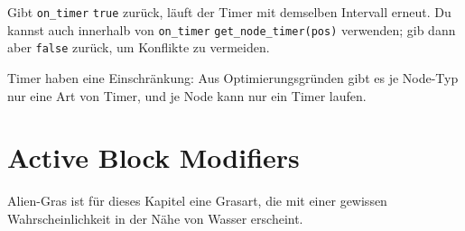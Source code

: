 Gibt \texttt{on\_\allowbreak{}timer} \texttt{true} zurück, läuft der
Timer mit demselben Intervall erneut. Du kannst auch innerhalb von
\texttt{on\_\allowbreak{}timer}
\texttt{get\_\allowbreak{}node\_\allowbreak{}timer(pos)} verwenden; gib
dann aber \texttt{false} zurück, um Konflikte zu vermeiden.

Timer haben eine Einschränkung: Aus Optimierungsgründen gibt es je
Node-Typ nur eine Art von Timer, und je Node kann nur ein Timer laufen.

\section{Active Block Modifiers}\label{active-block-modifiers}

Alien-Gras ist für dieses Kapitel eine Grasart, die mit einer gewissen
Wahrscheinlichkeit in der Nähe von Wasser erscheint.

